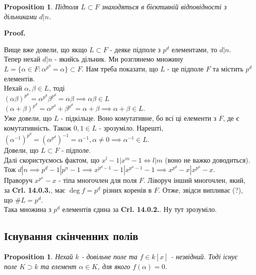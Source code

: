 \documentclass[a4paper, 10pt]{article}
\makeatletter
\theoremstyle{theoremdd}
\theoremstyle{theoremdd}
\theoremstyle{theoremdd}
\theoremstyle{theoremdd}
\theoremstyle{theoremdd}
\newtheorem{proposition}[theorem]{Proposition}
\theoremstyle{theoremdd}
\theoremstyle{theoremdd}
\theoremstyle{theoremdd}
\renewenvironment{proof}[1][Proof.\\]{\par
\pushQED{\hfill \qed}%
\normalfont \topsep6\p@\@plus6\p@\relax
\trivlist
\item\relax
{\bfseries
#1\@addpunct{.}}\hspace\labelsep\ignorespaces
}{%
\popQED\endtrivlist\@endpefalse
}
\makeatother
\begin{document}
\begin{proposition}
Підполя $L \subset F$ знаходяться в бієктивній відповідності з дільниками $d | n$.
\end{proposition}

\begin{proof}
Вище вже довели, що якщо $L \subset F$ - деяке підполе з $p^d$ елементами, то $d | n$.\\
Тепер нехай $d | n$ - якийсь дільник. Ми розглянемо множину $L = \{ \alpha \in F: \alpha^{p^d} = \alpha \} \subset F$. Нам треба показати, що $L$ - це підполе $F$ та містить $p^d$ елементів.\\
Нехай $\alpha,\beta \in L$, тоді \\
$(\alpha \beta)^{p^d} = \alpha^{p^d} \beta^{p^d} = \alpha \beta \implies \alpha \beta \in L$\\
$(\alpha + \beta)^{p^d} = \alpha^{p^d} + \beta^{p^d} = \alpha + \beta \implies \alpha + \beta \in L$.\\
Уже довели, що $L$ - підкільце. Воно комутативне, бо всі ці елементи з $F$, де є комутативність. Також $0,1 \in L$ - зрозуміло. Нарешті,\\
$(\alpha^{-1})^{p^d} = (\alpha^{p^d})^{-1} = \alpha^{-1}, \alpha \neq 0 \implies \alpha^{-1} \in L$.\\
Довели, що $L \subset F$ - підполе.\\
Далі скористуємось фактом, що $x^l - 1 | x^m - 1 \iff l | m$ (воно не важко доводиться).\\
Тож $d | n \implies p^d-1 | p^n - 1 \implies x^{p^d-1}-1 | x^{p^n-1}-1 \implies x^{p^d} - x | x^{p^n} - x$.\\
Праворуч $x^{p^n}-x$ - тіпа многочлен для поля $F$. Ліворуч інший многочлен, який, за \textbf{Crl. 14.0.3.}, має $\deg f = p^d$ різних коренів в $F$. Отже, звідси випливає (?), що $\# L = p^d$.\\
Така множина з $p^d$ елементів єдина за \textbf{Crl. 14.0.2.}. Ну тут зрозуміло.
\end{proof}

\subsection{Існування скінченних полів}
\begin{proposition}
Нехай $k$ - довільне поле та $f \in k[x]$ - незвідний. Тоді існує поле $K \supset k$ та елемент $\alpha \in K$, для якого $f(\alpha) = 0$.
\end{proposition}
\end{document}
